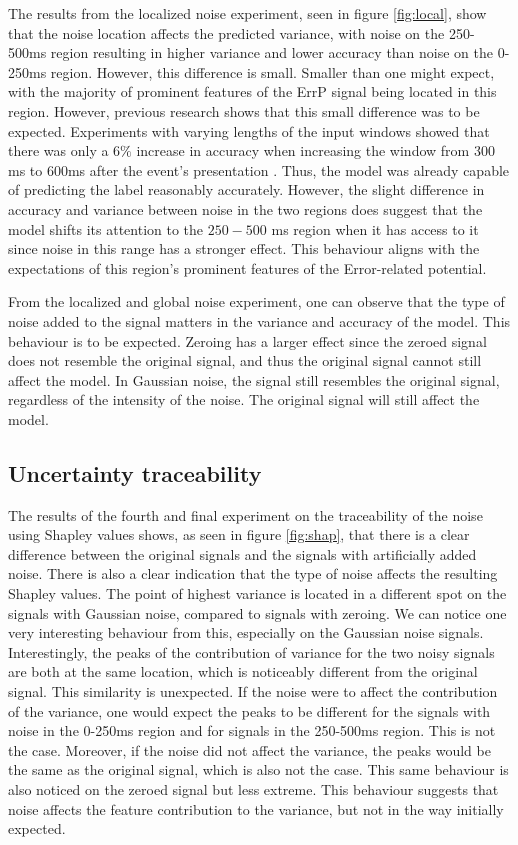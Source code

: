 The results from the localized noise experiment, seen in figure \ref{fig:local}, show that the noise location affects the predicted variance, with noise on the 250-500ms region resulting in higher variance and lower accuracy than noise on the 0-250ms region. However, this difference is small. Smaller than one might expect, with the majority of prominent features of the ErrP signal being located in this region. However, previous research shows that this small difference was to be expected. Experiments with varying lengths of the input windows showed that there was only a $6\%$ increase in accuracy when increasing the window from $300$ms to $600$ms after the event's presentation \citep{correia2021error}. Thus, the model was already capable of predicting the label reasonably accurately. However, the slight difference in accuracy and variance between noise in the two regions does suggest that the model shifts its attention to the $250-500$ ms region when it has access to it since noise in this range has a stronger effect. This behaviour aligns with the expectations of this region's prominent features of the Error-related potential.

From the localized and global noise experiment, one can observe that the type of noise added to the signal matters in the variance and accuracy of the model. This behaviour is to be expected. Zeroing has a larger effect since the zeroed signal does not resemble the original signal, and thus the original signal cannot still affect the model. In Gaussian noise, the signal still resembles the original signal, regardless of the intensity of the noise. The original signal will still affect the model.  

\subsection{Uncertainty traceability}

The results of the fourth and final experiment on the traceability of the noise using Shapley values shows, as seen in figure \ref{fig:shap}, that there is a clear difference between the original signals and the signals with artificially added noise. There is also a clear indication that the type of noise affects the resulting Shapley values. The point of highest variance is located in a different spot on the signals with Gaussian noise, compared to signals with zeroing. We can notice one very interesting behaviour from this, especially on the Gaussian noise signals. Interestingly, the peaks of the contribution of variance for the two noisy signals are both at the same location, which is noticeably different from the original signal. This similarity is unexpected. If the noise were to affect the contribution of the variance,  one would expect the peaks to be different for the signals with noise in the 0-250ms region and for signals in the 250-500ms region. This is not the case. Moreover, if the noise did not affect the variance, the peaks would be the same as the original signal, which is also not the case. This same behaviour is also noticed on the zeroed signal but less extreme. This behaviour suggests that noise affects the feature contribution to the variance, but not in the way initially expected.

